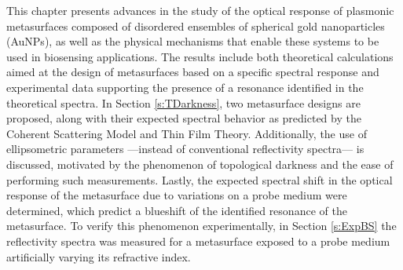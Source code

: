 
This chapter presents advances in the study of the optical response of plasmonic metasurfaces composed of disordered ensembles of spherical gold nanoparticles (AuNPs), as well as the physical mechanisms that enable these systems to be used in biosensing applications. The results include both theoretical calculations aimed at the design of metasurfaces based on a specific spectral response and experimental data supporting the presence of a resonance identified in the theoretical spectra. In Section \ref{s:TDarkness}, two metasurface designs are proposed, along with their expected spectral behavior as predicted by the Coherent Scattering Model and Thin Film Theory. Additionally, the use of ellipsometric parameters ---instead of conventional reflectivity spectra--- is discussed, motivated by the phenomenon of topological darkness and the ease of performing such measurements.  Lastly, the expected spectral shift in the optical response of the metasurface due to variations on a probe medium were determined, which predict a blueshift of the identified resonance of the metasurface. To verify this phenomenon experimentally, in Section \ref{s:ExpBS} the reflectivity spectra was measured for a metasurface exposed to a probe medium artificially varying  its refractive index.